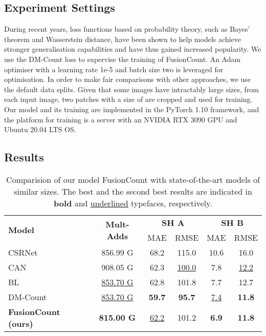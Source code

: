 \documentclass{article}
\begin{document}
\subsection{Experiment Settings}
\label{ssec:settings}

During recent years, loss functions based on probability theory, such as Bayes' theorem and Wasserstein distance, have been shown to help models achieve stronger generalisation capabilities and have thus gained increased popularity. We use the DM-Count loss \cite{DMCount} to supervise the training of FusionCount. An Adam optimiser \cite{Adam} with a learning rate 1e-5 and batch size two is leveraged for optimisation. In order to make fair comparisons with other approaches, we use the default data splits. Given that some images have intractably large sizes, from each input image, two patches with a size of  are cropped and used for training. Our model and its training are implemented in the PyTorch \cite{PyTorch} 1.10 framework, and the platform for training is a server with an NVIDIA RTX 3090 GPU and Ubuntu 20.04 LTS OS.
 
\subsection{Results}
\label{ssec:results}

\begin{table}[t]
\centering \scriptsize
\renewcommand*{\arraystretch}{1.4}
\caption{Comparision of our model FusionCount with state-of-the-art models of similar sizes. The best and the second best results are indicated in \textbf{bold} and  \underline{underlined} typefaces, respectively.}
\begin{tabular}{ l | c | c | c | c | c }
\toprule
\multirow{2}{*}{\bf Model} & \multirow{2}{*}{\bf Mult-Adds} & \multicolumn{2}{c|}{\bf SH A} & \multicolumn{2}{c}{\bf SH B} \\ \cline{3-6}
& & MAE & RMSE & MAE & RMSE \\
\midrule
CSRNet \cite{CSRNet} & 856.99 G & 68.2 & 115.0 & 10.6 & 16.0 \\
CAN \cite{CAN} & 908.05 G & 62.3 & \underline{100.0} & 7.8 & \underline{12.2} \\
BL \cite{BayesianLoss} & \underline{853.70 G} & 62.8 & 101.8 & 7.7 & 12.7 \\
DM-Count \cite{DMCount} & \underline{853.70 G} & \textbf{59.7} & \textbf{95.7} & \underline{7.4} & \textbf{11.8} \\
\bf FusionCount (ours) & \textbf{815.00 G} & \underline{62.2} & 101.2 & \textbf{6.9} & \textbf{11.8} \\
\bottomrule
\end{tabular}
\label{table:2}
\end{table}
\end{document}
